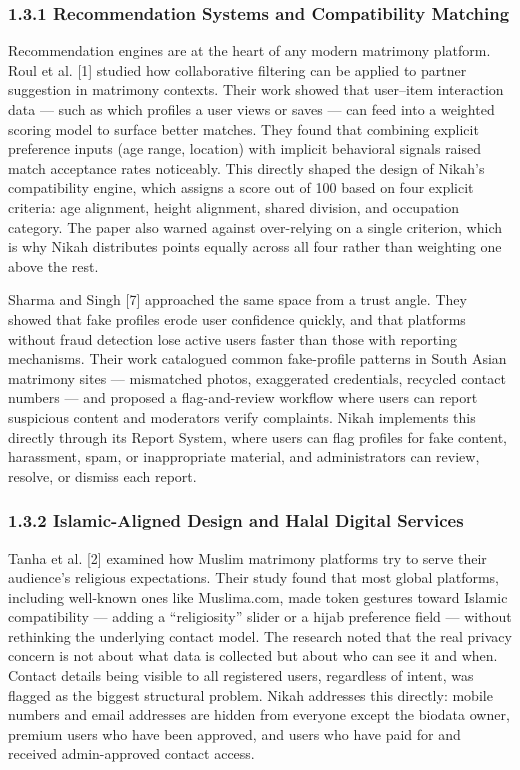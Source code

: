 \documentclass[conference]{IEEEtran}
\begin{document}
\subsubsection*{1.3.1 Recommendation Systems and Compatibility Matching}
Recommendation engines are at the heart of any modern matrimony platform. Roul et al. [1] studied how collaborative filtering can be applied to partner suggestion in matrimony contexts. Their work showed that user--item interaction data --- such as which profiles a user views or saves --- can feed into a weighted scoring model to surface better matches. They found that combining explicit preference inputs (age range, location) with implicit behavioral signals raised match acceptance rates noticeably. This directly shaped the design of Nikah's compatibility engine, which assigns a score out of 100 based on four explicit criteria: age alignment, height alignment, shared division, and occupation category. The paper also warned against over-relying on a single criterion, which is why Nikah distributes points equally across all four rather than weighting one above the rest.

Sharma and Singh [7] approached the same space from a trust angle. They showed that fake profiles erode user confidence quickly, and that platforms without fraud detection lose active users faster than those with reporting mechanisms. Their work catalogued common fake-profile patterns in South Asian matrimony sites --- mismatched photos, exaggerated credentials, recycled contact numbers --- and proposed a flag-and-review workflow where users can report suspicious content and moderators verify complaints. Nikah implements this directly through its Report System, where users can flag profiles for fake content, harassment, spam, or inappropriate material, and administrators can review, resolve, or dismiss each report.

\subsubsection*{1.3.2 Islamic-Aligned Design and Halal Digital Services}
Tanha et al. [2] examined how Muslim matrimony platforms try to serve their audience's religious expectations. Their study found that most global platforms, including well-known ones like Muslima.com, made token gestures toward Islamic compatibility --- adding a ``religiosity'' slider or a hijab preference field --- without rethinking the underlying contact model. The research noted that the real privacy concern is not about what data is collected but about who can see it and when. Contact details being visible to all registered users, regardless of intent, was flagged as the biggest structural problem. Nikah addresses this directly: mobile numbers and email addresses are hidden from everyone except the biodata owner, premium users who have been approved, and users who have paid for and received admin-approved contact access.
\end{document}

